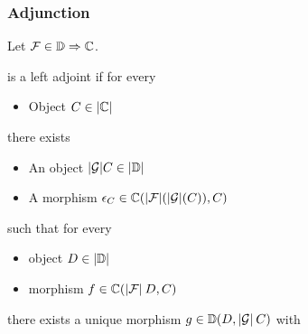 \documentclass[usenames,dvipsnames,rgb]{beamer}
\begin{document}
\begin{frame}[fragile]
  \frametitle{Adjunction}

  Let $\aFunctor \in \CatFunc{\aCategory[1]}{\aCategory}$.

  \aFunctor{} is a left adjoint if for every
  \begin{itemize}
  \item Object $C \in \CatObj{\aCategory}$
  \end{itemize}
  there exists
  \begin{itemize}
  \item An object $\FuncObj{\aFunctor[1]} C \in \CatObj{\aCategory[1]}$
  \item A morphism $\epsilon_C \in \CatMorph[\aCategory]{\FuncObj{\aFunctor}(\FuncObj{\aFunctor[1]}(C))}{C}$
  \end{itemize}
  such that for every
  \begin{itemize}
  \item object $D \in \CatObj{\aCategory[1]}$
  \item morphism $f \in \CatMorph[\aCategory]{\FuncObj{\aFunctor}\: D}{C}$
  \end{itemize}
  there exists a unique morphism $g \in \CatMorph[{\aCategory[1]}]{D}{\FuncObj{\aFunctor[1]}\:C}$
  with
\begin{center}
\end{center}


\end{frame}


\newcommand{\CatNatTrans}[2]{\ensuremath{#1 \stackrel{\cdot}{\Rightarrow} #2}}

\newcommand{\aNatTrans}[1][0]{%
  \ensuremath{%
    \ifthenelse%
        {\equal{#1}{0}}%
        {\varphi}%
        {\ifthenelse%
          {\equal{#1}{1}}%
          {\psi}%
          {\varphi_{\xinttheiexpr #1 - 2 \relax}}}}}
\end{document}
